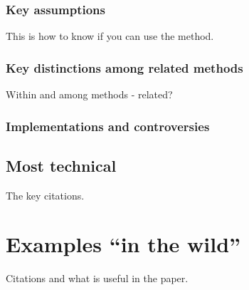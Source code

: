 \documentclass[
]{book}
\begin{document}
\hypertarget{key-assumptions-1}{%
\subsubsection{Key assumptions}\label{key-assumptions-1}}

This is how to know if you can use the method.

\hypertarget{key-distinctions-among-related-methods}{%
\subsubsection{Key distinctions among related methods}\label{key-distinctions-among-related-methods}}

Within and among methods - related?

\hypertarget{implementations-and-controversies}{%
\subsubsection{Implementations and controversies}\label{implementations-and-controversies}}

\hypertarget{most-technical}{%
\subsection{Most technical}\label{most-technical}}

The key citations.

\hypertarget{examples-in-the-wild}{%
\section{Examples ``in the wild''}\label{examples-in-the-wild}}

Citations and what is useful in the paper.

  
\end{document}
